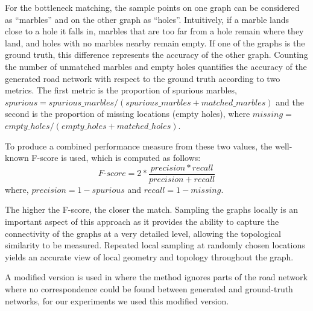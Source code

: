 \documentclass[natbib]{svjour3}                    \smartqed  \usepackage[table]{xcolor}
\begin{document}
For the bottleneck matching, the sample points on one graph can be considered as ``marbles'' and on the other graph as ``holes''. Intuitively, if a marble lands close to a hole it falls in, marbles that are too far from a hole remain where they land, and holes with no marbles nearby remain empty. If one of the graphs is the ground truth, this difference represents the accuracy of the other graph. Counting the number of unmatched marbles and empty holes quantifies the accuracy of the generated road network with respect to the ground truth according to two metrics. The first metric is the proportion of spurious marbles, $spurious =spurious\_ marbles /\left(spurious\_marbles + matched\_ marbles\right)$ and the second is the proportion of missing locations (empty holes), where $missing =$ $empty\_holes/\left(empty\_holes + matched\_holes\right)$.

To produce a combined performance measure from these two values, the well-known F-score is used, which is computed as follows:
\begin{equation}
F \mbox{-} score = 2 * \frac{precision * recall}{precision+recall} 
\end{equation}
where, $precision = 1 - spurious$ and $recall = 1-missing$.

The higher the F-score, the closer the match. Sampling the graphs locally is an important aspect of this approach as it provides the ability to capture the connectivity of the graphs at a very detailed level, 
allowing the topological similarity to be measured. Repeated local sampling at randomly chosen locations yields an accurate view of local geometry and topology throughout the graph.

A modified version is used in \cite{Biagioni:2012:MIF:2424321.2424333} where the method ignores parts of the road network where no correspondence could be found between generated and ground-truth networks, for our experiments we used this modified version.
\end{document}
